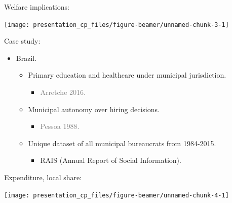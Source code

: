 \documentclass[ignorenonframetext,]{beamer}
\providecommand{\tightlist}{%
  \setlength{\itemsep}{0pt}\setlength{\parskip}{0pt}}
\begin{document}
\begin{frame}{Welfare implications:}

\begin{center}\texttt{[image: presentation\_cp\_files/figure-beamer/unnamed-chunk-3-1]} \end{center}

\end{frame}

\begin{frame}{Case study:}

\begin{itemize}[<+->]
\tightlist
\item
  Brazil.

  \begin{itemize}[<+->]
  \tightlist
  \item
    Primary education and healthcare under municipal jurisdiction.

    \begin{itemize}[<+->]
    \tightlist
    \item
      \textcolor{gray}{Arretche 2016.}
    \end{itemize}
  \item
    Municipal autonomy over hiring decisions.

    \begin{itemize}[<+->]
    \tightlist
    \item
      \textcolor{gray}{Pessoa 1988.}
    \end{itemize}
  \item
    Unique dataset of all municipal bureaucrats from 1984-2015.

    \begin{itemize}[<+->]
    \tightlist
    \item
      RAIS (Annual Report of Social Information).
    \end{itemize}
  \end{itemize}
\end{itemize}

\end{frame}

\begin{frame}{Expenditure, local share:}

\begin{center}\texttt{[image: presentation\_cp\_files/figure-beamer/unnamed-chunk-4-1]} \end{center}

\end{frame}
\end{document}
